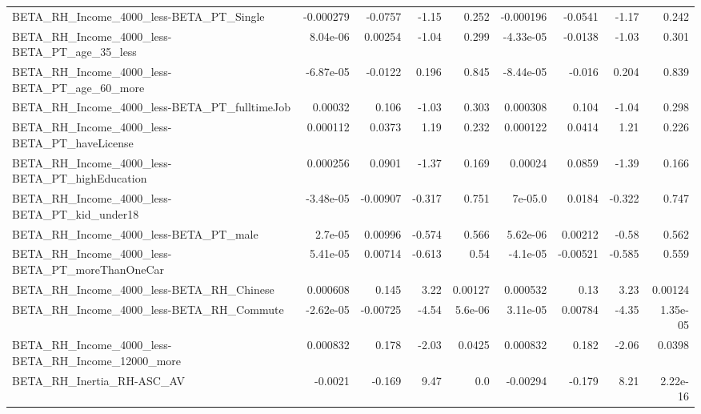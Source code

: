 \begin{tabular}{lrrrrrrrr}
BETA\_RH\_Income\_4000\_less-BETA\_PT\_Single            &   -0.000279 &      -0.0757 &    -1.15 &    0.252 &  -0.000196 &     -0.0541 &        -1.17 &         0.242 \\
BETA\_RH\_Income\_4000\_less-BETA\_PT\_age\_35\_less       &    8.04e-06 &      0.00254 &    -1.04 &    0.299 &  -4.33e-05 &     -0.0138 &        -1.03 &         0.301 \\
BETA\_RH\_Income\_4000\_less-BETA\_PT\_age\_60\_more       &   -6.87e-05 &      -0.0122 &    0.196 &    0.845 &  -8.44e-05 &      -0.016 &        0.204 &         0.839 \\
BETA\_RH\_Income\_4000\_less-BETA\_PT\_fulltimeJob       &     0.00032 &        0.106 &    -1.03 &    0.303 &   0.000308 &       0.104 &        -1.04 &         0.298 \\
BETA\_RH\_Income\_4000\_less-BETA\_PT\_haveLicense       &    0.000112 &       0.0373 &     1.19 &    0.232 &   0.000122 &      0.0414 &         1.21 &         0.226 \\
BETA\_RH\_Income\_4000\_less-BETA\_PT\_highEducation     &    0.000256 &       0.0901 &    -1.37 &    0.169 &    0.00024 &      0.0859 &        -1.39 &         0.166 \\
BETA\_RH\_Income\_4000\_less-BETA\_PT\_kid\_under18       &   -3.48e-05 &     -0.00907 &   -0.317 &    0.751 &    7e-05.0 &      0.0184 &       -0.322 &         0.747 \\
BETA\_RH\_Income\_4000\_less-BETA\_PT\_male              &     2.7e-05 &      0.00996 &   -0.574 &    0.566 &   5.62e-06 &     0.00212 &        -0.58 &         0.562 \\
BETA\_RH\_Income\_4000\_less-BETA\_PT\_moreThanOneCar    &    5.41e-05 &      0.00714 &   -0.613 &     0.54 &   -4.1e-05 &    -0.00521 &       -0.585 &         0.559 \\
BETA\_RH\_Income\_4000\_less-BETA\_RH\_Chinese           &    0.000608 &        0.145 &     3.22 &  0.00127 &   0.000532 &        0.13 &         3.23 &       0.00124 \\
BETA\_RH\_Income\_4000\_less-BETA\_RH\_Commute           &   -2.62e-05 &     -0.00725 &    -4.54 &  5.6e-06 &   3.11e-05 &     0.00784 &        -4.35 &      1.35e-05 \\
BETA\_RH\_Income\_4000\_less-BETA\_RH\_Income\_12000\_more &    0.000832 &        0.178 &    -2.03 &   0.0425 &   0.000832 &       0.182 &        -2.06 &        0.0398 \\
BETA\_RH\_Inertia\_RH-ASC\_AV                          &     -0.0021 &       -0.169 &     9.47 &      0.0 &   -0.00294 &      -0.179 &         8.21 &      2.22e-16 \\

\end{tabular}
